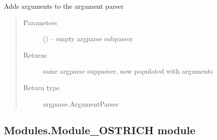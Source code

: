 \documentclass[letterpaper,10pt,english]{sphinxmanual}
\begin{document}
\begin{fulllineitems}
\label{\detokenize{MouseReferenceManual:Modules.Module_HODS.populateArgumentParser}}
Adds arguments to the argument parser
\begin{quote}\begin{description}
\item[{Parameters}] \leavevmode
{} () -- empty argparse subparser

\item[{Returns}] \leavevmode
same argparse supparser, now populated with arguments

\item[{Return type}] \leavevmode
argparse.ArgumentParser

\end{description}\end{quote}

\end{fulllineitems}



\subsection{Modules.Module\_OSTRICH module}
\label{\detokenize{MouseReferenceManual:modules-module-ostrich-module}}\label{\detokenize{MouseReferenceManual:module-Modules.Module_OSTRICH}}
\end{document}
